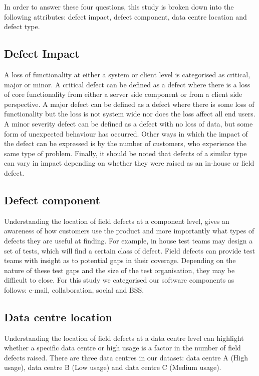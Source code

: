 In order to answer these four questions, this study is broken down into the following attributes: defect impact, defect component, data centre location and defect type.

\subsection{Defect Impact}

A loss of functionality at either a system or client level is categorised as critical, major or minor. A critical defect can be defined as a defect where there is a loss of core functionality from either a server side component or from a client side perspective. A major defect can be defined as a defect where there is some loss of functionality but the loss is not system wide nor does the loss affect all end users. A minor severity defect can be defined as a defect with no loss of data, but some form of unexpected behaviour has occurred.
Other ways in which the impact of the defect can be expressed is by the number of customers, who experience the same type of problem. Finally, it should be noted that defects of a similar type can vary in impact depending on whether they were raised as an in-house or field defect.

\subsection{Defect component}

Understanding the location of field defects at a component level, gives an awareness of how customers use the product and more importantly what types of defects they are useful at finding. For example, in house test teams may design a set of tests, which will find a certain class of defect. Field defects can provide test teams with insight as to potential gaps in their coverage. Depending on the nature of these test gaps and the size of the test organisation, they may be difficult to close. For this study we categorised our software components as follows: e-mail, collaboration, social and BSS.

\subsection{Data centre location}

Understanding the location of field defects at a data centre level can highlight whether a specific data centre or high usage is a factor in the number of field defects raised. There are three data centres in our dataset: data centre A (High usage), data centre B (Low usage) and data centre C (Medium usage).

